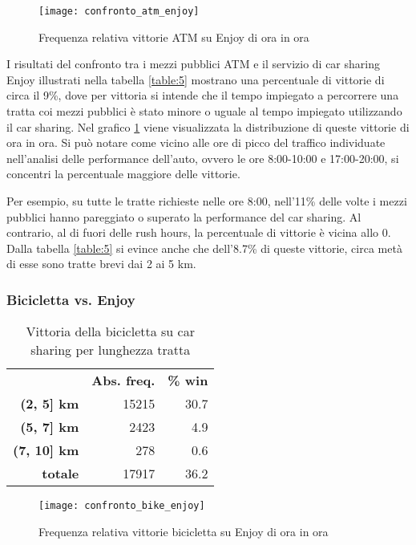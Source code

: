 \begin{figure}[H]
\texttt{[image: confronto\_atm\_enjoy]}
\caption{Frequenza relativa vittorie ATM su Enjoy di ora in ora}
\label{image:13}
\end{figure}

I risultati del confronto tra i mezzi pubblici ATM e il servizio di car sharing Enjoy illustrati nella tabella \ref{table:5} mostrano una percentuale di vittorie di circa il 9\%, dove per vittoria si intende che il tempo impiegato a percorrere una tratta coi mezzi pubblici è stato minore o uguale al tempo impiegato utilizzando il car sharing. Nel grafico \ref{image:13} viene visualizzata la distribuzione di queste vittorie di ora in ora. Si può notare come vicino alle ore di picco del traffico individuate nell'analisi delle performance dell'auto, ovvero le ore 8:00-10:00 e 17:00-20:00, si concentri la percentuale maggiore delle vittorie.

Per esempio, su tutte le tratte richieste nelle ore 8:00, nell'11\% delle volte i mezzi pubblici hanno pareggiato o superato la performance del car sharing. Al contrario, al di fuori delle rush hours, la percentuale di vittorie è vicina allo 0. Dalla tabella \ref{table:5} si evince anche che dell'8.7\% di queste vittorie, circa metà di esse sono tratte brevi dai 2 ai 5 km.

\subsubsection{Bicicletta vs. Enjoy}

\begin{table}[H]
\centering
\begin{tabular}{ | r r r | }
\hline
& \textbf{Abs. freq.} & \textbf{\% win} \\
\textbf{(2, 5] km} & 15215 & 30.7 \\
\textbf{(5, 7] km} & 2423 & 4.9 \\
\textbf{(7, 10] km} & 278 & 0.6 \\
\hline
\textbf{totale} & 17917 & 36.2 \\
\hline
\end{tabular}
\caption{Vittoria della bicicletta su car sharing per lunghezza tratta}
\label{table:6}
\end{table}

\begin{figure}[H]
\texttt{[image: confronto\_bike\_enjoy]}
\caption{Frequenza relativa vittorie bicicletta su Enjoy di ora in ora}
\label{image:14}
\end{figure}

